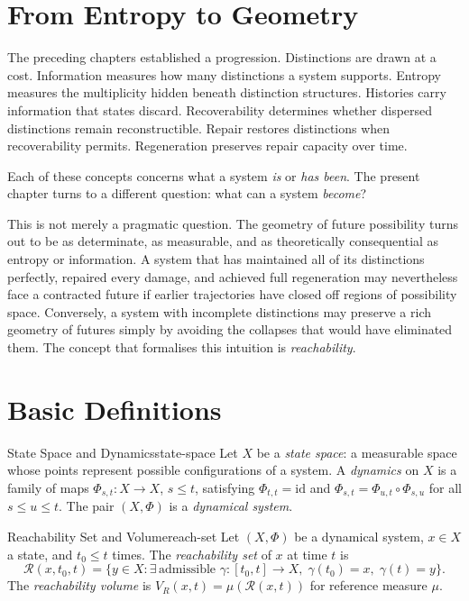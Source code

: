 \documentclass[12pt,twoside,openright]{book}
\newcommand{\reach}{\mathcal{R}}
\begin{document}
\section{From Entropy to Geometry}
\label{sec:ch13-motivation}

The preceding chapters established a progression.
Distinctions are drawn at a cost. Information measures how
many distinctions a system supports. Entropy measures the
multiplicity hidden beneath distinction structures.
Histories carry information that states discard.
Recoverability determines whether dispersed distinctions
remain reconstructible. Repair restores distinctions when
recoverability permits. Regeneration preserves repair
capacity over time.

Each of these concepts concerns what a system \emph{is} or
\emph{has been}. The present chapter turns to a different
question: what can a system \emph{become}?

This is not merely a pragmatic question. The geometry of
future possibility turns out to be as determinate, as
measurable, and as theoretically consequential as entropy
or information. A system that has maintained all of its
distinctions perfectly, repaired every damage, and achieved
full regeneration may nevertheless face a contracted future
if earlier trajectories have closed off regions of
possibility space. Conversely, a system with incomplete
distinctions may preserve a rich geometry of futures simply
by avoiding the collapses that would have eliminated them.
The concept that formalises this intuition is
\emph{reachability}.

\section{Basic Definitions}
\label{sec:ch13-defs}

\begin{definition}{State Space and Dynamics}{state-space}
  Let $X$ be a \emph{state space}: a measurable space whose
  points represent possible configurations of a system. A
  \emph{dynamics} on $X$ is a family of maps
  $\Phi_{s,t} : X \to X$, $s \le t$, satisfying
  $\Phi_{t,t} = \mathrm{id}$ and
  $\Phi_{s,t} = \Phi_{u,t} \circ \Phi_{s,u}$ for all
  $s \le u \le t$. The pair $(X,\Phi)$ is a \emph{dynamical
  system}.
\end{definition}

\begin{definition}{Reachability Set and Volume}{reach-set}
  Let $(X,\Phi)$ be a dynamical system, $x\in X$ a state,
  and $t_0 \le t$ times. The \emph{reachability set} of $x$
  at time $t$ is
  \[
    \reach(x,t_0,t) = \{
      y\in X : \exists\, \text{admissible }
      \gamma:[t_0,t]\to X,\;
      \gamma(t_0)=x,\; \gamma(t)=y
    \}.
  \]
  The \emph{reachability volume} is
  $V_R(x,t) = \mu(\reach(x,t))$ for reference measure $\mu$.
\end{definition}
\end{document}

